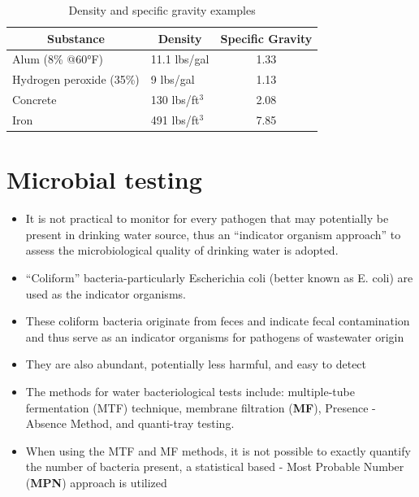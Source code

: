 \begin{table}[]
\centering
\begin{tabular}{|l|l|l|}
\hline
\multicolumn{1}{|c|}{\textbf{Substance}} & \multicolumn{1}{|c|}{\textbf{Density} }& \multicolumn{1}{|c|}{\textbf{Specific Gravity}}\\ \hline
Alum (8\% @60°F)                         & 11.1 lbs/gal     & \multicolumn{1}{|c|}{1.33 }                     \\ \hline
Hydrogen peroxide (35\%)                 & 9 lbs/gal        & \multicolumn{1}{|c|}{1.13 }                    \\ \hline
Concrete                                 & 130 lbs/ft$^3$      & \multicolumn{1}{|c|}{2.08 }                      \\ \hline
Iron                                     & 491 lbs/ft$^3$      & \multicolumn{1}{|c|}{7.85 }                     \\ \hline
\end{tabular}
\caption{Density and specific gravity examples}
\end{table}
\section{Microbial testing}
\begin{itemize}
\item It is not practical to monitor for every pathogen that may potentially be present in drinking water source, thus an “indicator organism approach” to assess the microbiological quality of drinking water is adopted.

\item “Coliform” bacteria-particularly Escherichia coli (better known as E. coli) are used as the indicator organisms.

\item These coliform bacteria originate from feces and indicate fecal contamination and thus serve as an indicator organisms for pathogens of wastewater origin
			\item They are also abundant, potentially less harmful, and easy to detect
\item The methods for water bacteriological tests include:  multiple-tube fermentation (MTF) technique, membrane filtration (\textbf{MF}), Presence - Absence Method,  and quanti-tray testing.  \item When using the MTF and MF methods, it is not possible to exactly quantify the number of bacteria present, a statistical based - Most Probable Number (\textbf{MPN}) approach is utilized\\
\end{itemize}
